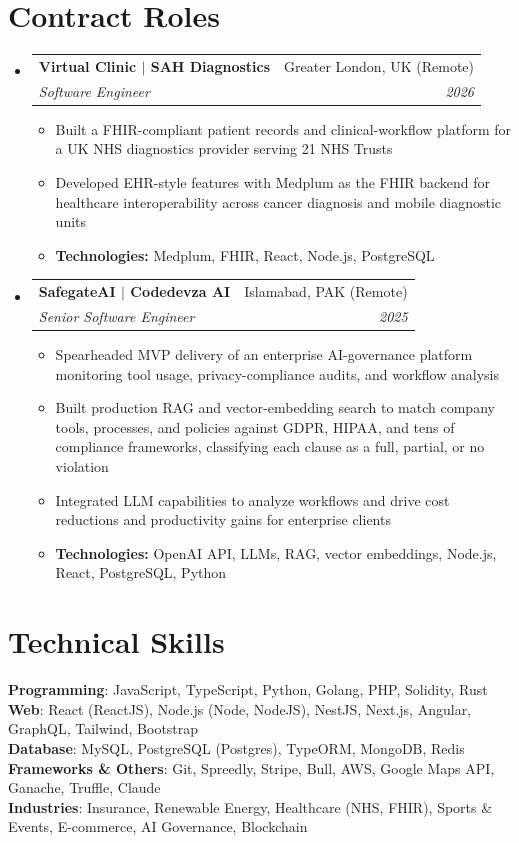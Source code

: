 \documentclass[letterpaper,11pt]{article}
\makeatletter
\newcommand{\resumeItem}[1]{
  \item\small{
    {#1 \vspace{-0pt}}
  }
}
\newcommand{\resumeSubheading}[4]{
  \vspace{-2pt}\item
    \begin{tabular*}{0.97\textwidth}[t]{l@{\extracolsep{\fill}}r}
      \textbf{#1} & #2 \\
      \textit{\small#3} & \textit{\small #4} \\
    \end{tabular*}\vspace{-7pt}
}
\newcommand{\resumeSubHeadingListStart}{\begin{itemize}[leftmargin=0.15in, label={}]}
\newcommand{\resumeSubHeadingListEnd}{\end{itemize}}
\newcommand{\resumeItemListStart}{\begin{itemize}}
\newcommand{\resumeItemListEnd}{\end{itemize}\vspace{-5pt}}
\makeatother
\begin{document}
\section{Contract Roles}
    \resumeSubHeadingListStart
      \resumeSubheading
        {Virtual Clinic $|$ SAH Diagnostics}{Greater London, UK (Remote)}
        {Software Engineer}{2026}
        \resumeItemListStart
          \resumeItem{Built a FHIR-compliant patient records and clinical-workflow platform for a UK NHS diagnostics provider serving 21 NHS Trusts}
          \resumeItem{Developed EHR-style features with Medplum as the FHIR backend for healthcare interoperability across cancer diagnosis and mobile diagnostic units}
          \resumeItem{\textbf{Technologies:} Medplum, FHIR, React, Node.js, PostgreSQL}
        \resumeItemListEnd
      \resumeSubheading
        {SafegateAI $|$ Codedevza AI}{Islamabad, PAK (Remote)}
        {Senior Software Engineer}{2025}
        \resumeItemListStart
          \resumeItem{Spearheaded MVP delivery of an enterprise AI-governance platform monitoring tool usage, privacy-compliance audits, and workflow analysis}
          \resumeItem{Built production RAG and vector-embedding search to match company tools, processes, and policies against GDPR, HIPAA, and tens of compliance frameworks, classifying each clause as a full, partial, or no violation}
          \resumeItem{Integrated LLM capabilities to analyze workflows and drive cost reductions and productivity gains for enterprise clients}
          \resumeItem{\textbf{Technologies:} OpenAI API, LLMs, RAG, vector embeddings, Node.js, React, PostgreSQL, Python}
        \resumeItemListEnd
    \resumeSubHeadingListEnd
%
\section{Technical Skills}
 \begin{itemize}[leftmargin=0.15in, label={}]
     \small{\item{
     \vspace{2pt}\textbf{Programming}{: JavaScript, TypeScript, Python, Golang, PHP, Solidity, Rust} \\
     \vspace{2pt}\textbf{Web}{: React (ReactJS), Node.js (Node, NodeJS), NestJS, Next.js, Angular, GraphQL, Tailwind, Bootstrap} \\
     \vspace{2pt}\textbf{Database}{: MySQL, PostgreSQL (Postgres), TypeORM, MongoDB, Redis} \\
     \vspace{2pt}\textbf{Frameworks \& Others}{: Git, Spreedly, Stripe, Bull, AWS, Google Maps API, Ganache, Truffle, Claude} \\
     \vspace{2pt}\textbf{Industries}{: Insurance, Renewable Energy, Healthcare (NHS, FHIR), Sports \& Events, E-commerce, AI Governance, Blockchain}
    }}
 \end{itemize}
\end{document}
